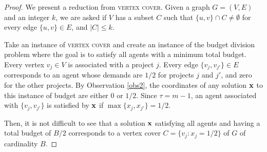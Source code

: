 \documentclass{article}
\begin{document}
\begin{proof}
We present a reduction from \textsc{vertex cover}. Given a graph $G=(V,E)$ and an integer $k$, we are asked if $V$ has a subset $C$ such that $\{u,v\} \cap C \neq \emptyset$ for every edge $\{u,v\} \in E$, and $|C| \le k$. 

Take an instance of \textsc{vertex cover} and create an instance of the budget division problem where the goal is to satisfy all agents with a minimum total budget.  Every vertex $v_j \in V$ is associated with a project $j$. Every edge $\{v_j,v_{j'}\} \in E$ corresponds to an agent whose demands are $1/2$ for projects $j$ and $j'$, and zero for the other projects. By Observation \ref{obs2}, the coordinates of any solution ${\bf x}$ to this instance of budget are either 0 or $1/2$. Since $\tau=m-1$, an agent associated with $\{v_j,v_{j'}\}$ is satisfied by ${\bf x}$ if $\max \{x_j,x_{j'}\}=1/2$. 

Then, it is not difficult to see that a solution ${\bf x}$ satisfying all agents and having a total budget of $B/2$ corresponds to a vertex cover $C=\{v_j : x_j=1/2\}$ of $G$ of cardinality $B$. \end{proof}
\end{document}
